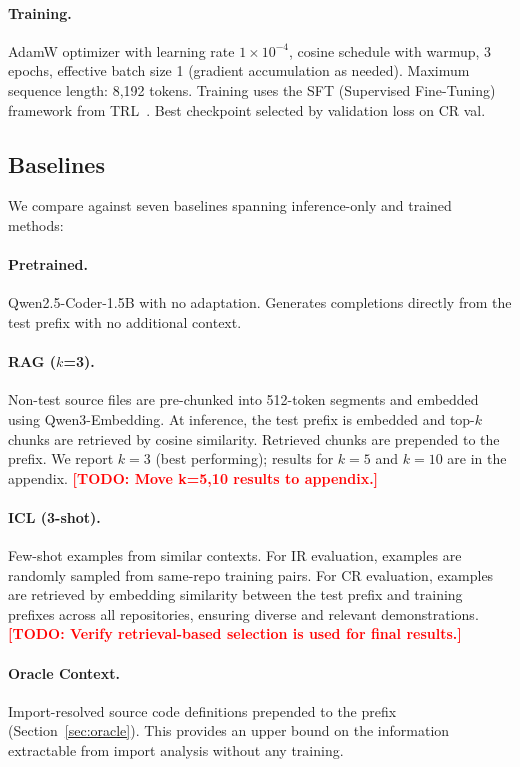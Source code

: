 \documentclass[11pt]{article}
\newcommand{\todo}[1]{\textcolor{red}{\textbf{[TODO: #1]}}}
\begin{document}
\paragraph{Training.}
AdamW optimizer with learning rate $1 \times 10^{-4}$, cosine schedule with warmup, 3 epochs, effective batch size 1 (gradient accumulation as needed).
Maximum sequence length: 8,192 tokens.
Training uses the SFT (Supervised Fine-Tuning) framework from TRL~\cite{vonwerra2022trl}.
Best checkpoint selected by validation loss on CR val.

\subsection{Baselines}
\label{sec:baselines}

We compare against seven baselines spanning inference-only and trained methods:

\paragraph{Pretrained.}
Qwen2.5-Coder-1.5B with no adaptation.
Generates completions directly from the test prefix with no additional context.

\paragraph{RAG ($k$=3).}
Non-test source files are pre-chunked into 512-token segments and embedded using Qwen3-Embedding.
At inference, the test prefix is embedded and top-$k$ chunks are retrieved by cosine similarity.
Retrieved chunks are prepended to the prefix.
We report $k=3$ (best performing); results for $k=5$ and $k=10$ are in the appendix.
\todo{Move k=5,10 results to appendix.}

\paragraph{ICL (3-shot).}
Few-shot examples from similar contexts.
For IR evaluation, examples are randomly sampled from same-repo training pairs.
For CR evaluation, examples are retrieved by embedding similarity between the test prefix and training prefixes across all repositories, ensuring diverse and relevant demonstrations.
\todo{Verify retrieval-based selection is used for final results.}

\paragraph{Oracle Context.}
Import-resolved source code definitions prepended to the prefix (Section~\ref{sec:oracle}).
This provides an upper bound on the information extractable from import analysis without any training.
\end{document}
